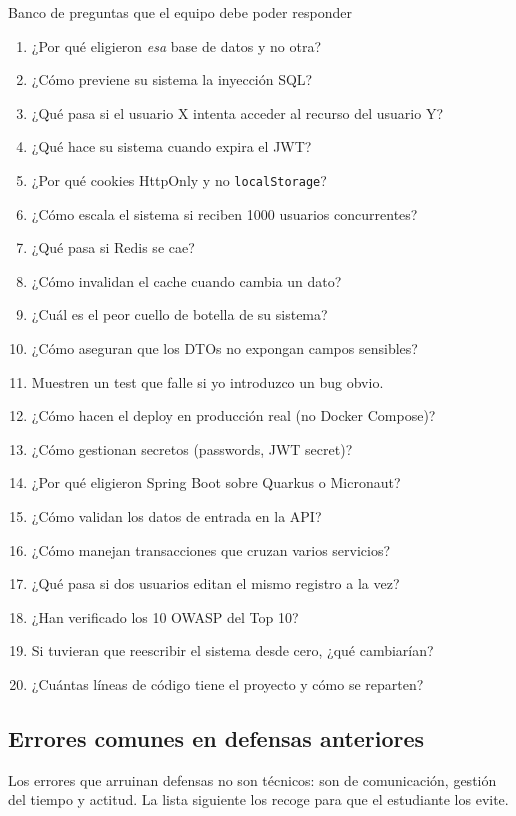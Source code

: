 \begin{cajabuenas}{Banco de preguntas que el equipo debe poder responder}
\begin{enumerate}
\item ¿Por qué eligieron \emph{esa} base de datos y no otra?
\item ¿Cómo previene su sistema la inyección SQL?
\item ¿Qué pasa si el usuario X intenta acceder al recurso del
usuario Y?
\item ¿Qué hace su sistema cuando expira el JWT?
\item ¿Por qué cookies HttpOnly y no \texttt{localStorage}?
\item ¿Cómo escala el sistema si reciben 1000 usuarios concurrentes?
\item ¿Qué pasa si Redis se cae?
\item ¿Cómo invalidan el cache cuando cambia un dato?
\item ¿Cuál es el peor cuello de botella de su sistema?
\item ¿Cómo aseguran que los DTOs no expongan campos sensibles?
\item Muestren un test que falle si yo introduzco un bug obvio.
\item ¿Cómo hacen el deploy en producción real (no Docker Compose)?
\item ¿Cómo gestionan secretos (passwords, JWT secret)?
\item ¿Por qué eligieron Spring Boot sobre Quarkus o Micronaut?
\item ¿Cómo validan los datos de entrada en la API?
\item ¿Cómo manejan transacciones que cruzan varios servicios?
\item ¿Qué pasa si dos usuarios editan el mismo registro a la vez?
\item ¿Han verificado los 10 OWASP del Top 10?
\item Si tuvieran que reescribir el sistema desde cero, ¿qué
cambiarían?
\item ¿Cuántas líneas de código tiene el proyecto y cómo se reparten?
\end{enumerate}
\end{cajabuenas}

\subsection{Errores comunes en defensas anteriores}

Los errores que arruinan defensas no son técnicos: son de
comunicación, gestión del tiempo y actitud. La lista siguiente los
recoge para que el estudiante los evite.


